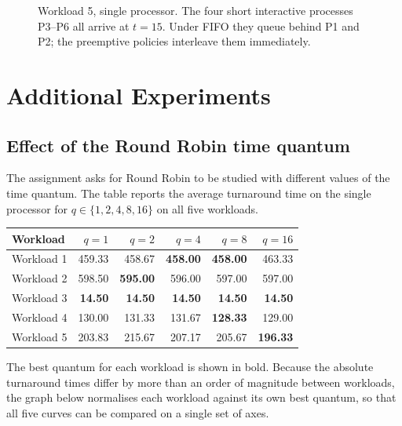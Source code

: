 \documentclass[11pt,a4paper]{article}
\begin{document}
\begin{figure}[H]
\par
\caption{Workload 5, single processor. The four short interactive processes P3--P6 all arrive at $t=15$. Under FIFO they queue behind P1 and P2; the preemptive policies interleave them immediately.}
\label{fig:gantt-single-5}
\end{figure}
\section{Additional Experiments}

\subsection{Effect of the Round Robin time quantum}

The assignment asks for Round Robin to be studied with different values of the time
quantum. The table reports the average turnaround time on the single processor for
$q \in \{1,2,4,8,16\}$ on all five workloads.

\begin{center}\small
\begin{tabular}{lrrrrr}
\toprule
\textbf{Workload} & $q=1$ & $q=2$ & $q=4$ & $q=8$ & $q=16$ \\
\midrule
Workload 1 & 459.33 & 458.67 & \textbf{458.00} & \textbf{458.00} & 463.33 \\
Workload 2 & 598.50 & \textbf{595.00} & 596.00 & 597.00 & 597.00 \\
Workload 3 & \textbf{14.50} & \textbf{14.50} & \textbf{14.50} & \textbf{14.50} & \textbf{14.50} \\
Workload 4 & 130.00 & 131.33 & 131.67 & \textbf{128.33} & 129.00 \\
Workload 5 & 203.83 & 215.67 & 207.17 & 205.67 & \textbf{196.33} \\
\bottomrule
\end{tabular}
\end{center}
\noindent The best quantum for each workload is shown in bold. Because the absolute
turnaround times differ by more than an order of magnitude between workloads, the graph
below normalises each workload against its own best quantum, so that all five curves can
be compared on a single set of axes.
\end{document}
